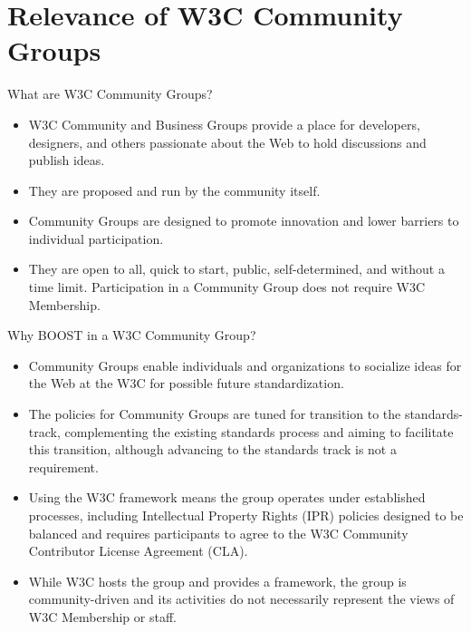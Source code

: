 \documentclass[presentation]{beamer}
\begin{document}
\section{Relevance of W3C Community Groups}
\label{relevance-of-w3c-community-groups}
\begin{frame}[label={sec:org9f6582a}]{What are W3C Community Groups?}
\begin{itemize}
\item W3C Community and Business Groups provide a place for developers, designers, and others passionate about the Web to hold discussions and publish ideas.
\item They are proposed and run by the community itself.
\item Community Groups are designed to promote innovation and lower barriers to individual participation.
\item They are open to all, quick to start, public, self-determined, and without a time limit. Participation in a Community Group does not require W3C Membership.
\end{itemize}
\end{frame}
\begin{frame}[label={sec:orge2fa8bb}]{Why BOOST in a W3C Community Group?}
\begin{itemize}
\item Community Groups enable individuals and organizations to socialize ideas for the Web at the W3C for possible future standardization.
\item The policies for Community Groups are \alert{tuned for transition to the standards-track}, complementing the existing standards process and aiming to facilitate this transition, although advancing to the standards track is not a requirement.
\item Using the W3C framework means the group operates under established processes, including Intellectual Property Rights (IPR) policies designed to be balanced and requires participants to agree to the W3C Community Contributor License Agreement (CLA).
\item While W3C hosts the group and provides a framework, the group is community-driven and its activities do not necessarily represent the views of W3C Membership or staff.
\end{itemize}
\end{frame}
\end{document}
